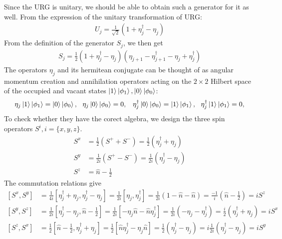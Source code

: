 Since the URG is unitary, we should be able to obtain such a generator for it as well. From the expression of the unitary transformation of URG:
\begin{equation}\begin{aligned}
	U_j = \frac{1}{\sqrt 2}\left( 1 + \eta_j^\dagger - \eta_j \right) 
\end{aligned}\end{equation}
From the definition of the generator \(S_j\), we then get
\begin{equation}\begin{aligned}
	S_j = \frac{1}{2}\left( 1 + \eta_j^\dagger - \eta_j \right) \left(\eta_{j+1} - \eta^\dagger_{j+1} - \eta_j + \eta^\dagger_{j}\right)
\end{aligned}\end{equation}
The operators \(\eta_j\) and its hermitean conjugate can be thought of as angular momentum creation and annihilation operators acting on the \(2\times 2\) Hilbert space of the occupied and vacant states \(\ket{1}\ket{\phi_{1}}, \ket{0}\ket{\phi_{0}}\):
\begin{align}
	\eta_j \ket{1}\ket{\phi_1} = \ket{0}\ket{\phi_{0}},~ ~\eta_j \ket{0}\ket{\phi_0} = 0, && \eta^\dagger_j \ket{0}\ket{\phi_{0}} = \ket{1}\ket{\phi_1},~ ~\eta^\dagger_j \ket{1}\ket{\phi_1} = 0,\\
\end{align}
To check whether they have the corect algebra, we design the three spin operators \(S^i, i=\{x,y,z\}\).
\begin{equation}\begin{aligned}
	S^x &= \frac{1}{2}\left(S^+ + S^-\right) = \frac{1}{2}\left(\eta^\dagger_j + \eta_j\right) \\
	S^y &= \frac{1}{2i}\left(S^+ - S^-\right) = \frac{1}{2i}\left(\eta^\dagger_j - \eta_j\right) \\
	S^z &= \hat n - \frac{1}{2}
\end{aligned}\end{equation}
The commutation relations give
\begin{equation}\begin{aligned}
	\left[S^x, S^y\right] &= \frac{1}{4i}\left[\eta^\dagger_j + \eta_j, \eta^\dagger_j - \eta_j\right] = \frac{1}{2i}\left[\eta_j, \eta_j^\dagger\right] = \frac{1}{2i}\left(1 - \hat n - \hat n\right) = \frac{-1}{i}\left(\hat n - \frac{1}{2}\right) = i S^z\\
	\left[S^y, S^z\right] &= \frac{1}{2i}\left[\eta^\dagger_j - \eta_j, \hat n - \frac{1}{2}\right] = \frac{1}{2i}\left[-\eta_j \hat n - \hat n \eta_j^\dagger\right] = \frac{1}{2i}\left(-\eta_j - \eta_j^\dagger\right) = \frac{i}{2}\left(\eta_j^\dagger + \eta_j\right)= i S^x\\
	\left[S^z, S^x\right] &= \frac{1}{2}\left[\hat n - \frac{1}{2}, \eta^\dagger_j + \eta_j\right] = \frac{1}{2}\left[\hat n \eta_j^\dagger - \eta_j\hat n \right] = \frac{1}{2}\left(\eta_j^\dagger - \eta_j\right) = i\frac{1}{2i}\left(\eta_j^\dagger - \eta_j\right) = i S^y\\
\end{aligned}\end{equation}
